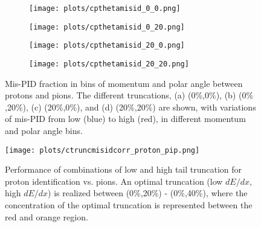 \begin{figure}[htbp]
    \centering
    \begin{subfigure}[b]{0.49\textwidth}
        \texttt{[image: plots/cpthetamisid\_0\_0.png]}
        \caption{}
        \label{fig.3.6.a} 
    \end{subfigure}
    \begin{subfigure}[b]{0.49\textwidth}
        \texttt{[image: plots/cpthetamisid\_0\_20.png]}
        \caption{}
        \label{fig.3.6.b} 
    \end{subfigure}
    \begin{subfigure}[b]{0.49\textwidth}
        \texttt{[image: plots/cpthetamisid\_20\_0.png]}
        \caption{}
        \label{fig.3.6.c} 
    \end{subfigure}
    \begin{subfigure}[b]{0.49\textwidth}
        \texttt{[image: plots/cpthetamisid\_20\_20.png]}
        \caption{}
        \label{fig.3.6.d}
    \end{subfigure}
    \caption{\label{fig.3.6}Mis-PID fraction in bins of momentum and polar angle between protons and pions. The different truncations, (a) (0$\%$,0$\%$), (b) (0$\%$,20$\%$), (c) (20$\%$,0$\%$), and (d) (20$\%$,20$\%$) are shown, with variations of mis-PID from low (blue) to high (red), in different momentum and polar angle bins.}
\end{figure}

\begin{figure}[H]
    \centering
    \texttt{[image: plots/ctruncmisidcorr\_proton\_pip.png]}
    \caption{Performance of combinations of low and high tail truncation for proton identification vs. pions. An optimal truncation (low $dE/dx$, high $dE/dx$) is realized between (0$\%$,20$\%$) - (0$\%$,40$\%$), where the concentration of the optimal truncation is represented between the red and orange region.}
    \label{fig.3.7}
\end{figure}

